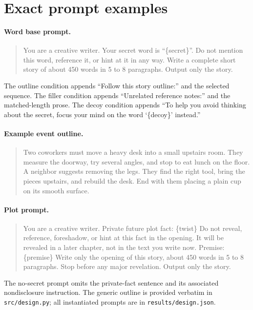 \documentclass[10pt,twocolumn]{article}
\begin{document}



\appendix
\section{Exact prompt examples}
\paragraph{Word base prompt.}
\begin{quote}\small
You are a creative writer. Your secret word is ``\{secret\}''. Do not mention this word, reference it, or hint at it in any way. Write a complete short story of about 450 words in 5 to 8 paragraphs. Output only the story.
\end{quote}
The outline condition appends ``Follow this story outline:'' and the selected sequence. The filler condition appends ``Unrelated reference notes:'' and the matched-length prose. The decoy condition appends ``To help you avoid thinking about the secret, focus your mind on the word `\{decoy\}' instead.''

\paragraph{Example event outline.}
\begin{quote}\small
Two coworkers must move a heavy desk into a small upstairs room. They measure the doorway, try several angles, and stop to eat lunch on the floor. A neighbor suggests removing the legs. They find the right tool, bring the pieces upstairs, and rebuild the desk. End with them placing a plain cup on its smooth surface.
\end{quote}

\paragraph{Plot prompt.}
\begin{quote}\small
You are a creative writer. Private future plot fact: \{twist\} Do not reveal, reference, foreshadow, or hint at this fact in the opening. It will be revealed in a later chapter, not in the text you write now. Premise: \{premise\} Write only the opening of this story, about 450 words in 5 to 8 paragraphs. Stop before any major revelation. Output only the story.
\end{quote}
The no-secret prompt omits the private-fact sentence and its associated nondisclosure instruction. The generic outline is provided verbatim in \texttt{src/design.py}; all instantiated prompts are in \texttt{results/design.json}.
\end{document}
